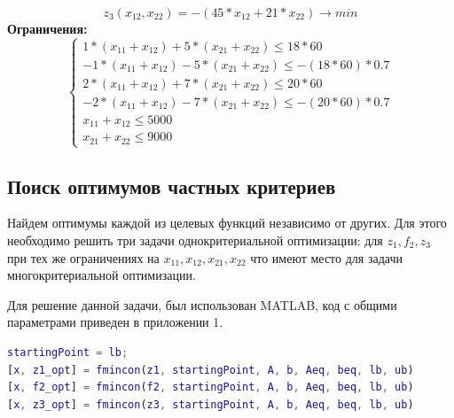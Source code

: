 \begin{equation}
z_3 (x_{12}, x_{22})= -(45*x_{12}+21*x_{22}) \rightarrow min
\end{equation}
\textbf{Ограничения:}
\begin{equation}
\begin{cases}
1*(x_{11}+x_{12})+5*(x_{21}+x_{22})\leq 18*60\\
-1*(x_{11}+x_{12})-5*(x_{21}+x_{22})\leq -(18*60)*0.7\\
2*(x_{11}+x_{12})+7*(x_{21}+x_{22})\leq 20*60\\
-2*(x_{11}+x_{12})-7*(x_{21}+x_{22})\leq -(20*60)*0.7\\
x_{11}+x_{12}\leq 5000\\
x_{21}+x_{22}\leq 9000
\end{cases}
\end{equation}
\subsection{Поиск оптимумов частных критериев}
Найдем оптимумы каждой из целевых функций независимо от других. Для этого необходимо решить три задачи однокритериальной оптимизации: для $z_1, f_2, z_3$ при тех же ограничениях на $x_{11}, x_{12}, x_{21}, x_{22}$ что имеют место для задачи многокритериальной оптимизации.

Для решение данной задачи, был использован MATLAB, код с общими параметрами приведен в приложении 1.

\begin{lstlisting}[language={matlab}, caption={Поиск оптимумов частных критериев}, label={lst:1}]
%% Поиск оптимумов частных критериев
startingPoint = lb;
[x, z1_opt] = fmincon(z1, startingPoint, A, b, Aeq, beq, lb, ub)
[x, f2_opt] = fmincon(f2, startingPoint, A, b, Aeq, beq, lb, ub)
[x, z3_opt] = fmincon(z3, startingPoint, A, b, Aeq, beq, lb, ub)
\end{lstlisting}

